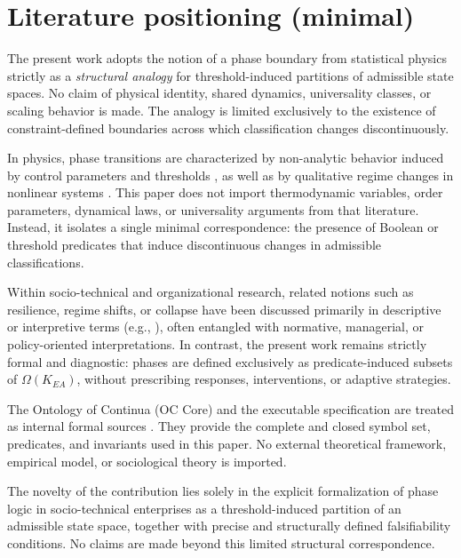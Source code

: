 ﻿\section{Literature positioning (minimal)}
\label{sec:lit}

The present work adopts the notion of a phase boundary from statistical physics
strictly as a \emph{structural analogy} for threshold-induced partitions of
admissible state spaces. No claim of physical identity, shared dynamics,
universality classes, or scaling behavior is made. The analogy is limited
exclusively to the existence of constraint-defined boundaries across which
classification changes discontinuously.

In physics, phase transitions are characterized by non-analytic behavior induced
by control parameters and thresholds \cite{stanley1971phase}, as well as by
qualitative regime changes in nonlinear systems \cite{strogatz2018nonlinear}.
This paper does not import thermodynamic variables, order parameters, dynamical
laws, or universality arguments from that literature. Instead, it isolates a
single minimal correspondence: the presence of Boolean or threshold predicates
that induce discontinuous changes in admissible classifications.

Within socio-technical and organizational research, related notions such as
resilience, regime shifts, or collapse have been discussed primarily in
descriptive or interpretive terms (e.g., \cite{holling1973resilience}), often
entangled with normative, managerial, or policy-oriented interpretations.
In contrast, the present work remains strictly formal and diagnostic: phases
are defined exclusively as predicate-induced subsets of $\Omega(K_{EA})$, without
prescribing responses, interventions, or adaptive strategies.

The Ontology of Continua (OC Core) and the executable specification
 are treated as internal formal sources
\cite{oc_core_internal,ets_keav11_internal}. They provide the complete and closed
symbol set, predicates, and invariants used in this paper. No external theoretical
framework, empirical model, or sociological theory is imported.

The novelty of the contribution lies solely in the explicit formalization of
phase logic in socio-technical enterprises as a threshold-induced partition of an
admissible state space, together with precise and structurally defined
falsifiability conditions. No claims are made beyond this limited structural
correspondence.
